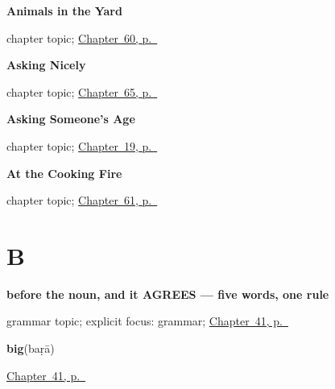 \noindent\begin{minipage}[t]{\linewidth}
\raggedright
\textbf{Animals in the Yard}\par
\footnotesize chapter topic; \hyperref[ch:hi-animals-in-the-yard]{Chapter~60, p.~\pageref*{ch:hi-animals-in-the-yard}}
\end{minipage}\par\smallskip

\noindent\begin{minipage}[t]{\linewidth}
\raggedright
\textbf{Asking Nicely}\par
\footnotesize chapter topic; \hyperref[ch:hi-asking-nicely]{Chapter~65, p.~\pageref*{ch:hi-asking-nicely}}
\end{minipage}\par\smallskip

\noindent\begin{minipage}[t]{\linewidth}
\raggedright
\textbf{Asking Someone's Age}\par
\footnotesize chapter topic; \hyperref[ch:hi-asking-age]{Chapter~19, p.~\pageref*{ch:hi-asking-age}}
\end{minipage}\par\smallskip

\noindent\begin{minipage}[t]{\linewidth}
\raggedright
\textbf{At the Cooking Fire}\par
\footnotesize chapter topic; \hyperref[ch:hi-at-the-cooking-fire]{Chapter~61, p.~\pageref*{ch:hi-at-the-cooking-fire}}
\end{minipage}\par\smallskip

\section*{B}

\noindent\begin{minipage}[t]{\linewidth}
\raggedright
\textbf{before the noun, and it AGREES — five words, one rule}\par
\footnotesize grammar topic; explicit focus: grammar; \hyperref[ch:hi-describing-things]{Chapter~41, p.~\pageref*{ch:hi-describing-things}}
\end{minipage}\par\smallskip

\noindent\begin{minipage}[t]{\linewidth}
\raggedright
\textbf{big}\enspace\emph{}\enspace(baṛā)\par
\footnotesize \hyperref[ch:hi-describing-things]{Chapter~41, p.~\pageref*{ch:hi-describing-things}}
\end{minipage}\par\smallskip

